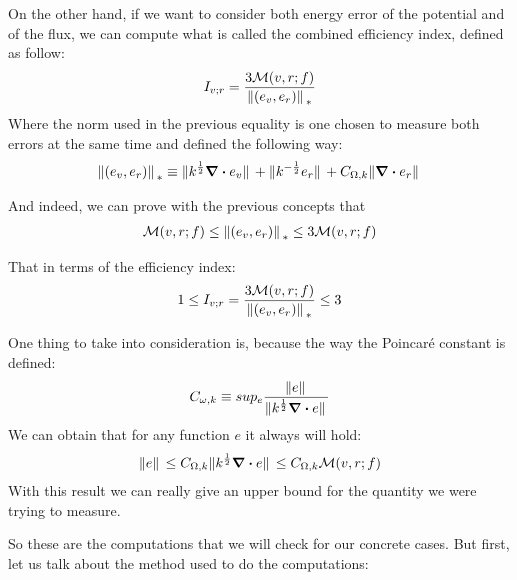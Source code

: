 \documentclass{article}
\begin{document}
    On the other hand, if we want to consider both energy error of the potential and of the flux, we can compute what is called the combined efficiency index, defined as follow:
    \begin{align*}
        I_{v;r} = \frac{3\mathcal{M}(v,r;f)}{\norm*{(e_v, e_r)}_*}
    \end{align*}
    Where the norm used in the previous equality is one chosen to measure both errors at the same time and defined the following way:
    \begin{align*}
        \norm*{(e_v,e_r)}_{*} \equiv \norm*{k^{\frac{1}{2}}\div e_v} + \norm*{k^{-\frac{1}{2}}e_r} + C_{\Omega,k}\norm*{\div e_r}
    \end{align*}
    
    And indeed, we can prove with the previous concepts that 
    \begin{align*}
        \mathcal{M}(v,r;f) \leq  \norm*{(e_v,e_r)}_{*}  \leq 3\mathcal{M}(v,r;f)
    \end{align*}

    That in terms of the efficiency index:
    \begin{align*}
        1 \leq I_{v;r} = \frac{3\mathcal{M}(v,r;f)}{\norm*{(e_v, e_r)}_*} \leq 3
    \end{align*}

    One thing to take into consideration is, because the way the Poincaré constant is defined:
    \begin{align*}
        C_{\omega,k} \equiv sup_e \frac{\norm*{e}}{\norm*{k^{\frac{1}{2}}\div{e}}}
    \end{align*}
    We can obtain that for any function $e$ it always will hold:
    \begin{align*}
        \norm*{e} \leq C_{\Omega,k}\norm*{k^{\frac{1}{2}}\div{e}} \leq C_{\Omega,k}\mathcal{M}(v,r;f)
    \end{align*}
    With this result we can really give an upper bound for the quantity we were trying to measure.

    So these are the computations that we will check for our concrete cases. But first, let us talk about the method used to do the computations:
\end{document}
